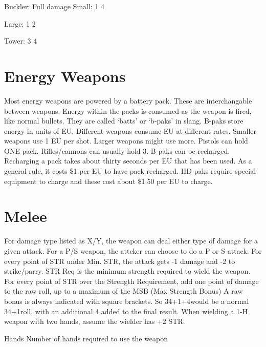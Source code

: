 \documentclass[twoside]{book}
\begin{document}
                    Buckler: Full damage   
                    Small:  1  4
                   
                    
                    Large:  1  2
                   
                    
                    Tower:  3  4
                   
                    
                  
                
            
\section{Energy Weapons}
      Most energy weapons are powered by a battery pack.
             These are interchangable between weapons. Energy within the
             packs is consumed as the weapon is fired, like normal
             bullets. They are called `batts' or
             `b-paks' in slang. B-paks store energy in units
             of EU. Different weapons consume EU at different rates.
             Smaller weapons use 1 EU per shot. Larger weapons might use
             more. Pistols can hold ONE pack. Rifles/cannons can usually
             hold 3. B-paks can be recharged. Recharging a pack takes
             about thirty seconds per EU that has been used. As a general
             rule, it costs \$1 per EU to have pack recharged. HD paks
             require special equipment to charge and these cost about
             \$1.50 per EU to charge. 
\section{Melee}
      For damage type listed as X/Y, the weapon can deal
             either type of damage for a given attack. For a P/S weapon,
             the attcker can choose to do a P or S attack. For every
             point of STR under Min. STR, the attack gets -1 damage and
             -2 to strike/parry. STR Req is the minimum strength required
             to wield the weapon. For every point of STR over the
             Strength Requirement, add one point of damage to the raw
             roll, up to a maximum of the MSB (Max Strength Bonus) A raw
             bonus is always indicated with square brackets. So 34+1+4would be a normal 34+1roll, with an additional 4
             added to the final result. When wielding a 1-H weapon with
             two hands, assume the wielder has +2 STR.   
            
                Hands   Number of hands
                required to use the weapon
              
\end{document}
